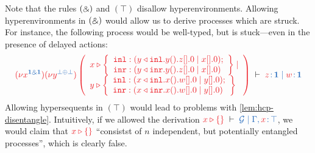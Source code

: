 \documentclass[submission,copyright,creativecommons]{eptcs}
\begin{document}
Note that the rules $(\mathbin{\binampersand})$ and $(\top)$ disallow hyperenvironments. Allowing hyperenvironments in $(\mathbin{\binampersand})$ would allow us to derive processes which are struck. For instance, the following process would be well-typed, but is stuck---even in the presence of delayed actions:
\[
\seq[{
  \tm{\piNew{x^{\ty{\one \with \one}}}{\piNew{y^{\ty{\bot \plus \bot}}}{\left(
          \begin{array}{l}
            x \triangleright
            \left\{
            \begin{array}{l}
              \texttt{inl}: (\cpInl{y}{\cpWait{y}{\cpHalt{z}}} \ppar \cpHalt{x});
              \\
              \texttt{inr}: (\cpInr{y}{\cpWait{y}{\cpHalt{z}}} \ppar \cpHalt{x})
            \end{array}
            \right\}
            \ppar
            \\
            y \triangleright
            \left\{
            \begin{array}{l}
              \texttt{inl}: (\cpInl{x}{\cpWait{x}{\cpHalt{w}}} \ppar \cpHalt{y});
              \\
              \texttt{inr}: (\cpInr{x}{\cpWait{x}{\cpHalt{w}}} \ppar \cpHalt{y})
            \end{array}
            \right\}
          \end{array}
        \right)}}}
}]{
  \tmty{z}{\one} \hsep \tmty{w}{\one}
}
\]
Allowing hypersequents in $(\top)$ would lead to problems with \cref{lem:hcp-disentangle}. Intuitively, if we allowed the derivation $\seq[\cpAbsurd{x}]{\mathcal{G} \hsep \Gamma, \tmty{x}{\top}}$, we would claim that $\tm{\cpAbsurd{x}}$ ``consistst of $n$ independent, but potentially entangled processes'', which is clearly false.
\end{document}
